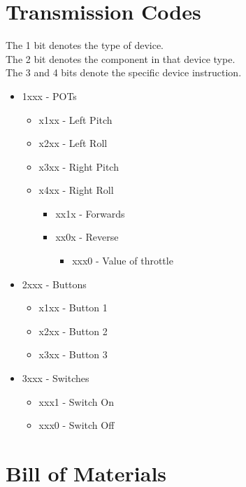 \documentclass [12pt]{article}
\begin{document}
\section{Transmission Codes}\label{app:transmission_codes}
{\parindent0pt
The 1 bit denotes the type of device.\\
The 2 bit denotes the component in that device type.\\
The 3 and 4 bits denote the specific device instruction.\\
}
\begin{itemize}
\item 1xxx - POTs
    \begin{itemize}
        \item x1xx - Left Pitch
        \item x2xx - Left Roll
	    \item x3xx - Right Pitch
		\item x4xx - Right Roll
		\begin{itemize}
			\item xx1x - Forwards
			\item xx0x - Reverse
			\begin{itemize}
				\item xxx0 - Value of throttle
			\end{itemize}
		\end{itemize}
     \end{itemize}
\item 2xxx - Buttons
	\begin{itemize}
		\item x1xx - Button 1
		\item x2xx - Button 2
		\item x3xx - Button 3
	\end{itemize}
\item 3xxx - Switches
	\begin{itemize}
		\item xxx1 - Switch On
		\item xxx0 - Switch Off
	\end{itemize}
\end{itemize}

\section{Bill of Materials}\label{app:bill_of_materials}
\end{document}
